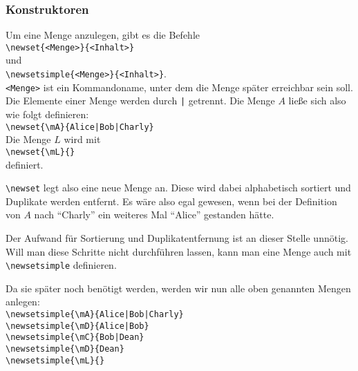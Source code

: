 \subsubsection{Konstruktoren}\label{konstruktoren}
Um eine Menge anzulegen, gibt es die Befehle\\
\mbox{}\hspace{2em}\verb$\newset{<Menge>}{<Inhalt>}$\\
und\\
\mbox{}\hspace{2em}\verb$\newsetsimple{<Menge>}{<Inhalt>}$.\\
\texttt{<Menge>} ist ein Kommandoname, unter dem die Menge später erreichbar sein soll. Die Elemente einer Menge werden durch \texttt{|} getrennt. Die Menge $A$ ließe sich also wie folgt definieren:\\
\mbox{}\hspace{2em}\verb$\newset{\mA}{Alice|Bob|Charly}$\\
Die Menge $L$ wird mit\\
\mbox{}\hspace{2em}\verb$\newset{\mL}{}$\\
definiert.

\verb$\newset$ legt also eine neue Menge an. Diese wird dabei alphabetisch sortiert und Duplikate werden entfernt. Es wäre also egal gewesen, wenn bei der Definition von $A$ nach "`Charly"' ein weiteres Mal "`Alice"' gestanden hätte.

Der Aufwand für Sortierung und Duplikatentfernung ist an dieser Stelle unnötig. Will man diese Schritte nicht durchführen lassen, kann man eine Menge auch mit \verb$\newsetsimple$ definieren.

Da sie später noch benötigt werden, werden wir nun alle oben genannten Mengen anlegen:\\
\mbox{}\hspace{2em}\verb$\newsetsimple{\mA}{Alice|Bob|Charly}$ \\
\mbox{}\hspace{2em}\verb$\newsetsimple{\mD}{Alice|Bob}$ \\
\mbox{}\hspace{2em}\verb$\newsetsimple{\mC}{Bob|Dean}$ \\
\mbox{}\hspace{2em}\verb$\newsetsimple{\mD}{Dean}$ \\
\mbox{}\hspace{2em}\verb$\newsetsimple{\mL}{}$ \newsetsimple{\mL}{}
